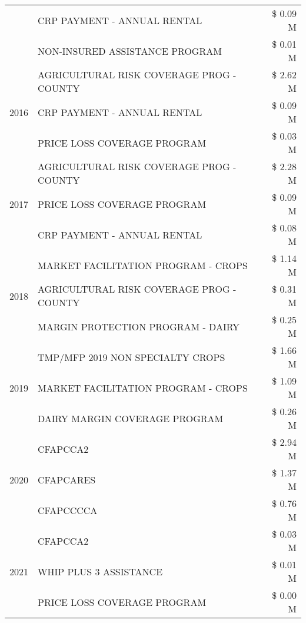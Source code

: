 \begin{tabular}{llr}
 & CRP PAYMENT - ANNUAL RENTAL & \$ 0.09 M \\
 & NON-INSURED ASSISTANCE PROGRAM & \$ 0.01 M \\
\cline{1-3}
\multirow[t]{3}{*}{2016} & AGRICULTURAL RISK COVERAGE PROG - COUNTY & \$ 2.62 M \\
 & CRP PAYMENT - ANNUAL RENTAL & \$ 0.09 M \\
 & PRICE LOSS COVERAGE PROGRAM & \$ 0.03 M \\
\cline{1-3}
\multirow[t]{3}{*}{2017} & AGRICULTURAL RISK COVERAGE PROG - COUNTY & \$ 2.28 M \\
 & PRICE LOSS COVERAGE PROGRAM & \$ 0.09 M \\
 & CRP PAYMENT - ANNUAL RENTAL & \$ 0.08 M \\
\cline{1-3}
\multirow[t]{3}{*}{2018} & MARKET FACILITATION PROGRAM - CROPS & \$ 1.14 M \\
 & AGRICULTURAL RISK COVERAGE PROG - COUNTY & \$ 0.31 M \\
 & MARGIN PROTECTION PROGRAM - DAIRY & \$ 0.25 M \\
\cline{1-3}
\multirow[t]{3}{*}{2019} & TMP/MFP 2019 NON SPECIALTY CROPS & \$ 1.66 M \\
 & MARKET FACILITATION PROGRAM - CROPS & \$ 1.09 M \\
 & DAIRY MARGIN COVERAGE PROGRAM & \$ 0.26 M \\
\cline{1-3}
\multirow[t]{3}{*}{2020} & CFAPCCA2 & \$ 2.94 M \\
 & CFAPCARES & \$ 1.37 M \\
 & CFAPCCCCA & \$ 0.76 M \\
\cline{1-3}
\multirow[t]{3}{*}{2021} & CFAPCCA2 & \$ 0.03 M \\
 & WHIP PLUS 3 ASSISTANCE & \$ 0.01 M \\
 & PRICE LOSS COVERAGE PROGRAM & \$ 0.00 M \\
\cline{1-3}
\bottomrule
\end{tabular}
